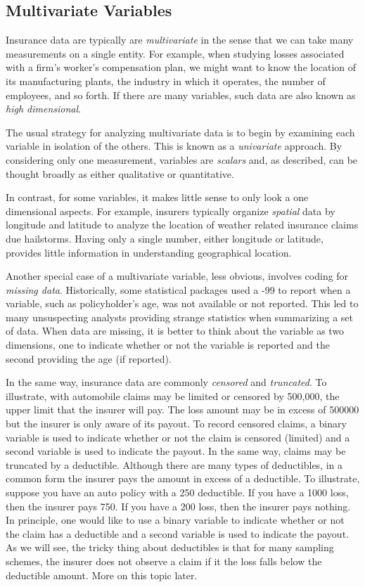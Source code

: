 \documentclass[]{book}
\theoremstyle{definition}
\theoremstyle{definition}
\theoremstyle{definition}
\theoremstyle{remark}
\begin{document}
\subsection{Multivariate Variables}\label{multivariate-variables}

Insurance data are typically are \emph{multivariate} in the sense that
we can take many measurements on a single entity. For example, when
studying losses associated with a firm's worker's compensation plan, we
might want to know the location of its manufacturing plants, the
industry in which it operates, the number of employees, and so forth. If
there are many variables, such data are also known as \emph{high
dimensional}.

The usual strategy for analyzing multivariate data is to begin by
examining each variable in isolation of the others. This is known as a
\emph{univariate} approach. By considering only one measurement,
variables are \emph{scalars} and, as described, can be thought broadly
as either qualitative or quantitative.

In contrast, for some variables, it makes little sense to only look a
one dimensional aspects. For example, insurers typically organize
\emph{spatial} data by longitude and latitude to analyze the location of
weather related insurance claims due hailstorms. Having only a single
number, either longitude or latitude, provides little information in
understanding geographical location.

Another special case of a multivariate variable, less obvious, involves
coding for \emph{missing data}. Historically, some statistical packages
used a -99 to report when a variable, such as policyholder's age, was
not available or not reported. This led to many unsuspecting analysts
providing strange statistics when summarizing a set of data. When data
are missing, it is better to think about the variable as two dimensions,
one to indicate whether or not the variable is reported and the second
providing the age (if reported).

In the same way, insurance data are commonly \emph{censored} and
\emph{truncated}. To illustrate, with automobile claims may be limited
or censored by 500,000, the upper limit that the insurer will pay. The
loss amount may be in excess of 500000 but the insurer is only aware of
its payout. To record censored claims, a binary variable is used to
indicate whether or not the claim is censored (limited) and a second
variable is used to indicate the payout. In the same way, claims may be
truncated by a deductible. Although there are many types of deductibles,
in a common form the insurer pays the amount in excess of a deductible.
To illustrate, suppose you have an auto policy with a 250 deductible. If
you have a 1000 loss, then the insurer pays 750. If you have a 200 loss,
then the insurer pays nothing. In principle, one would like to use a
binary variable to indicate whether or not the claim has a deductible
and a second variable is used to indicate the payout. As we will see,
the tricky thing about deductibles is that for many sampling schemes,
the insurer does not observe a claim if it the loss falls below the
deductible amount. More on this topic later.
\end{document}

